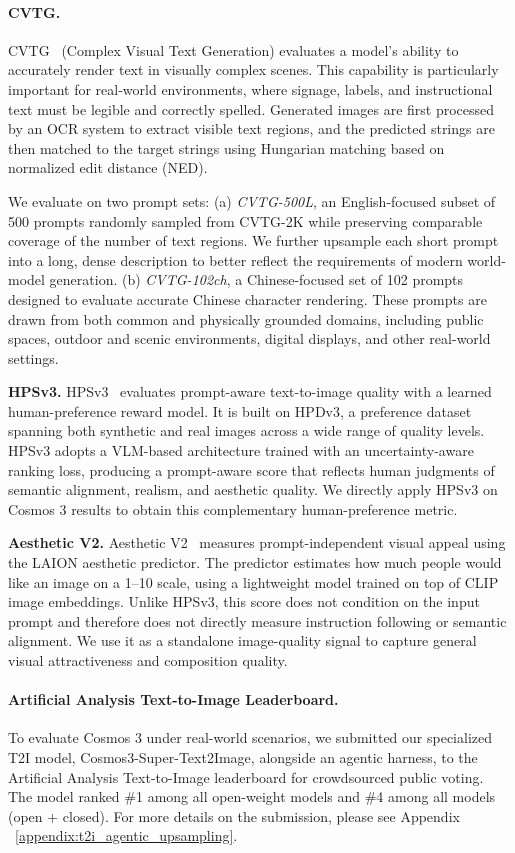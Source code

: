 \paragraph{CVTG.} CVTG~\citep{du2025textcrafter} (Complex Visual Text Generation) evaluates a model's ability to accurately render text in visually complex scenes. This capability is particularly important for real-world environments, where signage, labels, and instructional text must be legible and correctly spelled. Generated images are first processed by an OCR system to extract visible text regions, and the predicted strings are then matched to the target strings using Hungarian matching based on normalized edit distance (\ie NED).

We evaluate on two prompt sets:
(a) \textit{CVTG-500L}, an English-focused subset of 500 prompts randomly sampled from CVTG-2K while preserving comparable coverage of the number of text regions. We further upsample each short prompt into a long, dense description to better reflect the requirements of modern world-model generation.
(b) \textit{CVTG-102ch}, a Chinese-focused set of 102 prompts designed to evaluate accurate Chinese character rendering. These prompts are drawn from both common and physically grounded domains, including public spaces, outdoor and scenic environments, digital displays, and other real-world settings.

\textbf{HPSv3.} HPSv3~\citep{ma2025hpsv3} evaluates prompt-aware text-to-image quality with a learned human-preference reward model. It is built on HPDv3, a preference dataset spanning both synthetic and real images across a wide range of quality levels. HPSv3 adopts a VLM-based architecture trained with an uncertainty-aware ranking loss, producing a prompt-aware score that reflects human judgments of semantic alignment, realism, and aesthetic quality. We directly apply HPSv3 on Cosmos 3 results to obtain this complementary human-preference metric.

\textbf{Aesthetic V2.} Aesthetic V2~\citep{laionaesthetics} measures prompt-independent visual appeal using the LAION aesthetic predictor. The predictor estimates how much people would like an image on a 1--10 scale, using a lightweight model trained on top of CLIP image embeddings. Unlike HPSv3, this score does not condition on the input prompt and therefore does not directly measure instruction following or semantic alignment. We use it as a standalone image-quality signal to capture general visual attractiveness and composition quality.




\paragraph{Artificial Analysis Text-to-Image Leaderboard.} To evaluate Cosmos 3 under real-world scenarios, we submitted our specialized T2I model, Cosmos3-Super-Text2Image, alongside an agentic harness, to the Artificial Analysis Text-to-Image leaderboard for crowdsourced public voting. The model ranked \#1 among all open-weight models and \#4 among all models (open $+$ closed). For more details on the submission, please see Appendix ~\ref{appendix:t2i_agentic_upsampling}.
